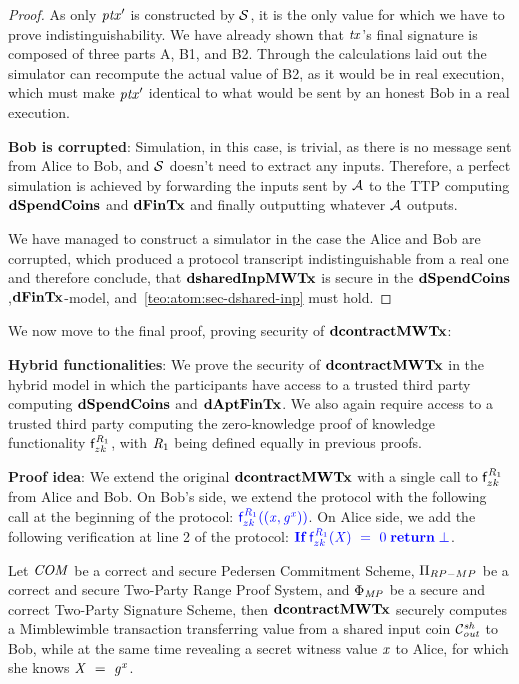 \begin{proof}
    As only ${\mathit{ptx}}'$ is constructed by $\mathcal{S}$, it is the only value for which we have to prove indistinguishability.
    We have already shown that $\mathit{tx}$'s final signature is composed of three parts A, B1, and B2.
    Through the calculations laid out the simulator can recompute the actual value of B2, as it would be in real execution, which must make ${\mathit{ptx}}'$ identical to what would be sent by an honest Bob in a real execution.

    \textbf{Bob is corrupted}: Simulation, in this case, is trivial, as there is no message sent from Alice to Bob, and $\mathcal{S}$ doesn't need to extract any inputs.
    Therefore, a perfect simulation is achieved by forwarding the inputs sent by $\mathcal{A}$ to the TTP computing $\mathbf{dSpendCoins}$ and $\mathbf{dFinTx}$ and finally outputting whatever $\mathcal{A}$ outputs.

    We have managed to construct a simulator in the case the Alice and Bob are corrupted, which produced a protocol transcript indistinguishable from a real one and therefore conclude, that $\mathbf{dsharedInpMWTx}$ is secure in the $\mathbf{dSpendCoins}$,$\mathbf{dFinTx}$-model, and~\cref{teo:atom:sec-dshared-inp} must hold.
\end{proof}

We now move to the final proof, proving security of $\mathbf{dcontractMWTx}$:

\textbf{Hybrid functionalities}: We prove the security of $\mathbf{dcontractMWTx}$ in the hybrid model in which the participants have access to a trusted third party computing $\mathbf{dSpendCoins}$ and $\mathbf{dAptFinTx}$.
We also again require access to a trusted third party computing the zero-knowledge proof of knowledge functionality $\mathsf{f}^{\mathit{R}_1}_{zk}$, with $\mathit{R}_1$ being defined equally in previous proofs.

\textbf{Proof idea}: We extend the original $\mathbf{dcontractMWTx}$ with a single call to $\mathsf{f}^{\mathit{R}_1}_{zk}$ from Alice and Bob.
On Bob's side, we extend the protocol with the following call at the beginning of the protocol: $\color{blue} \mathsf{f}^{\mathit{R}_1}_{zk}((\mathit{x}, \mathit{g}^{\mathit{x}}))$.
On Alice side, we add the following verification at line 2 of the protocol: $\color{blue} \textbf{If}\; \mathsf{f}^{\mathit{R}_1}_{zk}(\mathit{X}) ~=~ 0 \; \textbf{return}\; \bot$.

\begin{theorem}
    \label{teo:atom:sec-dcontract-mw}
    Let $\mathit{COM}$ be a correct and secure Pedersen Commitment Scheme, $\Pi_{RP-MP}$ be a correct and secure Two-Party Range Proof System, and $\Phi_{\mathit{MP}}$ be a secure and correct Two-Party Signature Scheme, then $\mathbf{dcontractMWTx}$ securely computes a Mimblewimble transaction transferring value from a shared input coin $\mathcal{C}_{\mathit{out}}^{\mathit{sh}}$ to Bob, while at the same time revealing a secret witness value $\mathit{x}$ to Alice, for which she knows $\mathit{X} ~=~ \mathit{g}^{\mathit{x}}$.
\end{theorem}

